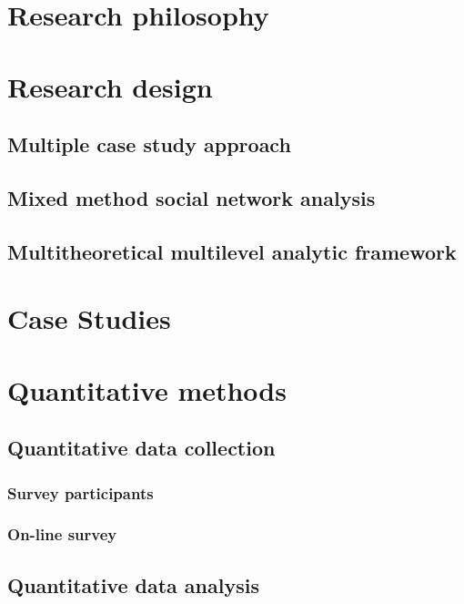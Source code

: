 
\section{Research philosophy}

\section{Research design}

\subsection{Multiple case study approach}

\subsection{Mixed method social network analysis}

\subsection{Multitheoretical multilevel analytic framework}

\section{Case Studies}

\section{Quantitative methods}

\subsection{Quantitative data collection}

\subsubsection{Survey participants}

\subsubsection{On-line survey}

\subsection{Quantitative data analysis}

